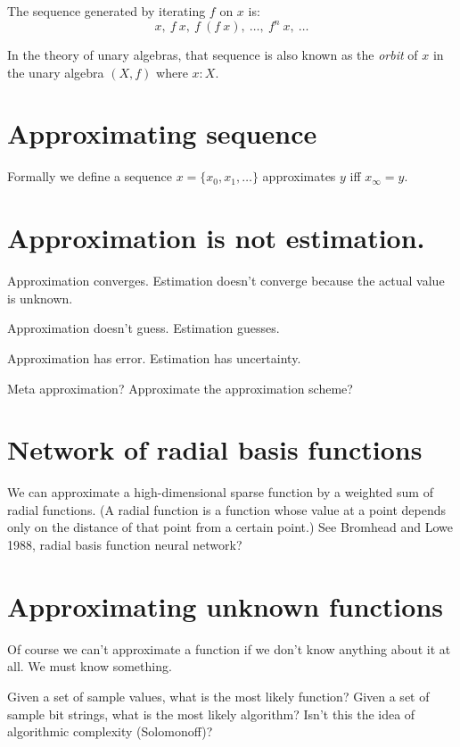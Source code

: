 The sequence generated by iterating \(f\) on \(x\) is:
\[
    x, ~ f~x, ~ f~(f~x), ~ \ldots, ~ f^n~x, ~ \ldots
\]

In the theory of unary algebras, that sequence is also known as
the \emph{orbit} of \(x\) in the unary algebra \((X,f)\)
where \(x : X\).

\section{Approximating sequence}

Formally we define a sequence \(x = \{ x_0, x_1, \ldots \}\) approximates \(y\) iff \(x_\infty = y\).

\section{Approximation is not estimation.}

Approximation converges.
Estimation doesn't converge because the actual value is unknown.

Approximation doesn't guess.
Estimation guesses.

Approximation has error.
Estimation has uncertainty.

Meta approximation? Approximate the approximation scheme?

\section{Network of radial basis functions}

We can approximate a high-dimensional sparse function
by a weighted sum of radial functions.
(A radial function is a function whose value at a point
depends only on the distance of that point from a certain point.)
See Bromhead and Lowe 1988, radial basis function neural network?

\section{Approximating unknown functions}

Of course we can't approximate a function
if we don't know anything about it at all.
We must know something.

Given a set of sample values,
what is the most likely function?
Given a set of sample bit strings,
what is the most likely algorithm?
Isn't this the idea of algorithmic complexity (Solomonoff)?

